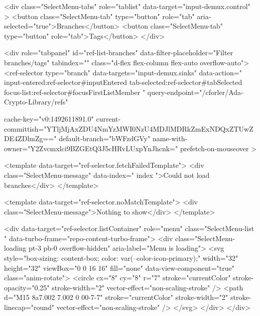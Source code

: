         <div class="SelectMenu-tabs" role="tablist" data-target="input-demux.control" >
          <button class="SelectMenu-tab" type="button" role="tab" aria-selected="true">Branches</button>
          <button class="SelectMenu-tab" type="button" role="tab">Tags</button>
        </div>

        <div role="tabpanel" id="ref-list-branches" data-filter-placeholder="Filter branches/tags" tabindex="" class="d-flex flex-column flex-auto overflow-auto">
          <ref-selector
            type="branch"
            data-targets="input-demux.sinks"
            data-action="
              input-entered:ref-selector#inputEntered
              tab-selected:ref-selector#tabSelected
              focus-list:ref-selector#focusFirstListMember
            "
            query-endpoint="/cforler/Ada-Crypto-Library/refs"
            
            cache-key="v0:1492611891.0"
            current-committish="YTljMjAxZDU4NmYzMWI0NzU4MDJlMDRkZmExNDQxZTUwZDE4ZDlmZg=="
            default-branch="bWFzdGVy"
            name-with-owner="Y2Zvcmxlci9BZGEtQ3J5cHRvLUxpYnJhcnk="
            prefetch-on-mouseover
          >

            <template data-target="ref-selector.fetchFailedTemplate">
              <div class="SelectMenu-message" data-index="{{ index }}">Could not load branches</div>
            </template>

              <template data-target="ref-selector.noMatchTemplate">
    <div class="SelectMenu-message">Nothing to show</div>
</template>


            <div data-target="ref-selector.listContainer" role="menu" class="SelectMenu-list " data-turbo-frame="repo-content-turbo-frame">
              <div class="SelectMenu-loading pt-3 pb-0 overflow-hidden" aria-label="Menu is loading">
                <svg style="box-sizing: content-box; color: var(--color-icon-primary);" width="32" height="32" viewBox="0 0 16 16" fill="none" data-view-component="true" class="anim-rotate">
  <circle cx="8" cy="8" r="7" stroke="currentColor" stroke-opacity="0.25" stroke-width="2" vector-effect="non-scaling-stroke" />
  <path d="M15 8a7.002 7.002 0 00-7-7" stroke="currentColor" stroke-width="2" stroke-linecap="round" vector-effect="non-scaling-stroke" />
</svg>
              </div>
            </div>

              

